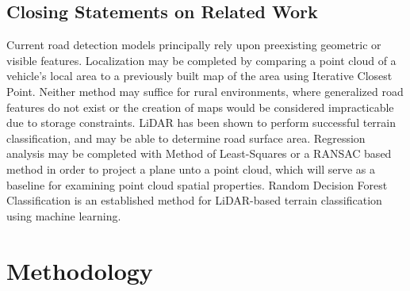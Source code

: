 \documentclass[numbered,pdftex]{ohio-etd}
\begin{document}
{{	}
	
	\section{Closing Statements on Related Work}{
		
		{Current road detection models principally rely upon preexisting geometric or visible features. Localization may be completed by comparing a point cloud of a vehicle's local area to a previously built map of the area using Iterative Closest Point. Neither method may suffice for rural environments, where generalized road features do not exist or the creation of maps would be considered impracticable due to storage constraints. LiDAR has been shown to perform successful terrain classification, and may be able to determine road surface area. Regression analysis may be completed with Method of Least-Squares or a RANSAC based method in order to project a plane unto a point cloud, which will serve as a baseline for examining point cloud spatial properties. Random Decision Forest Classification is an established method for LiDAR-based terrain classification using machine learning.}
		
	} %
	
} %

\chapter{Methodology}
\end{document}

